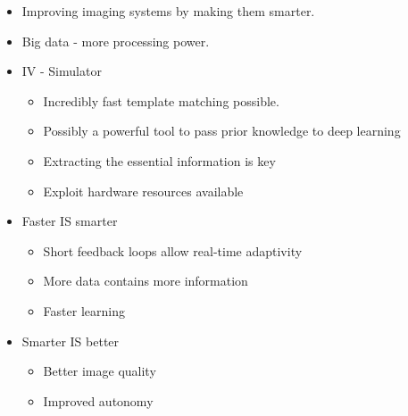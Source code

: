 \documentclass[thesis.tex]{subfiles}
\begin{document}
\begin{itemize}
\item Improving imaging systems by making them smarter.
\item Big data - more processing power.
\item IV - Simulator
\begin{itemize}
	\item Incredibly fast template matching possible.
	\item Possibly a powerful tool to pass prior knowledge to deep learning
	\item Extracting the essential information is key 
	\item Exploit hardware resources available
\end{itemize}
\item Faster IS smarter
 \begin{itemize}
 	\item Short feedback loops allow real-time adaptivity
 	\item More data contains more information
 	\item Faster learning
 \end{itemize}
\item Smarter IS better
 \begin{itemize}
	\item Better image quality
	\item Improved autonomy
\end{itemize}
\end{itemize}
\end{document}
